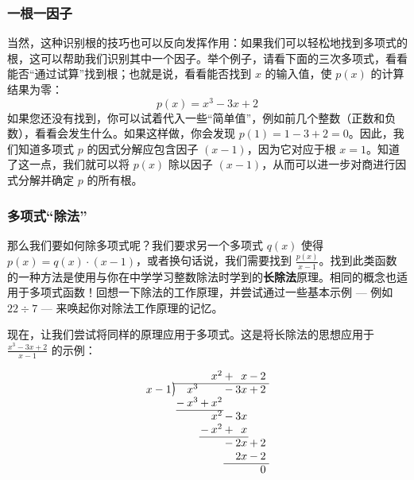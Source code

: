 \subsubsection*{一根一因子}

当然，这种识别根的技巧也可以反向发挥作用：如果我们可以轻松地找到多项式的根，这可以帮助我们识别其中一个因子。举个例子，请看下面的三次多项式，看看能否``通过试算''找到根；也就是说，看看能否找到 $x$ 的输入值，使 $p(x)$ 的计算结果为零：
\[p(x) = x^3 - 3x + 2\]
如果您还没有找到，你可以试着代入一些``简单值''，例如前几个整数（正数和负数），看看会发生什么。如果这样做，你会发现 $p(1) = 1 - 3 + 2 = 0$。因此，我们知道多项式 $p$ 的因式分解应包含因子 $(x - 1)$，因为它对应于根 $x = 1$。知道了这一点，我们就可以将 $p(x)$ 除以因子 $(x - 1)$，从而可以进一步对商进行因式分解并确定 $p$ 的所有根。

\subsubsection*{多项式``除法''}

那么我们要如何除多项式呢？我们要求另一个多项式 $q(x)$ 使得 $p(x) = q(x) \cdot (x - 1)$，或者换句话说，我们需要找到 $\frac{p(x)}{x-1}$。找到此类函数的一种方法是使用与你在中学学习整数除法时学到的\textbf{长除法}原理。相同的概念也适用于多项式函数！回想一下除法的工作原理，并尝试通过一些基本示例 --- 例如 $22 \div 7$ --- 来唤起你对除法工作原理的记忆。

现在，让我们尝试将同样的原理应用于多项式。这是将长除法的思想应用于 $\frac{x^3-3x+2}{x-1}$ 的示例：

\[
\arraycolsep=1pt
\begin{array}{*1r @{\hskip\arraycolsep}c@{\hskip\arraycolsep} *{9}r}
        &          &   &      &   & x^2 & + &  x & - & 2 &  \\
\cline{2-11}
x-1     & \longdiv &   & x^3  &   &  & -    & 3x & + & 2 &  \\
        &          & - & x^3  & + & x^2 &   &    &   &   &  \\
\cline{3-6}
        &          &   &      &   & x^2 & - & 3x &   &   &  \\
        &          &   &      & - & x^2 & + &  x &   &   &  \\
\cline{5-8}
        &          &   &      &   &     & - & 2x & + & 2 &  \\
        &          &   &      &   &     &   & 2x & - & 2 &  \\
\cline{7-11}
        &          &   &      &   &     &   &    &   & 0 &  \\
\end{array}
\]

